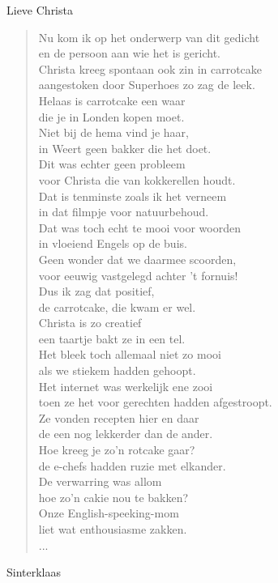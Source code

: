 \documentclass[12pt]{brief}
\begin{document}
\begin{letter}{Lieve Christa}
\begin{verse}
Nu kom ik op het onderwerp van dit gedicht\\
en de persoon aan wie het is gericht.\\
Christa kreeg spontaan ook zin in carrotcake\\
aangestoken door Superhoes zo zag de leek.\\[1.5em]

Helaas is carrotcake een waar\\
die je in Londen kopen moet.\\
Niet bij de hema vind je haar,\\
in Weert geen bakker die het doet.\\[1.5em]

Dit was echter geen probleem\\
voor Christa die van kokkerellen houdt.\\
Dat is tenminste zoals ik het verneem\\
in dat filmpje voor natuurbehoud.\\[1.5em]

Dat was toch echt te mooi voor woorden\\
in vloeiend Engels op de buis.\\
Geen wonder dat we daarmee scoorden,\\
voor eeuwig vastgelegd achter 't fornuis!\\[1.5em]

Dus ik zag dat positief,\\
de carrotcake, die kwam er wel.\\
Christa is zo creatief\\
een taartje bakt ze in een tel.\\[1.5em]

Het bleek toch allemaal niet zo mooi\\
als we stiekem hadden gehoopt.\\
Het internet was werkelijk ene zooi\\
toen ze het voor gerechten hadden afgestroopt.\\[1.5em]

Ze vonden recepten hier en daar\\
de een nog lekkerder dan de ander.\\
Hoe kreeg je zo'n rotcake gaar?\\
de e-chefs hadden ruzie met elkander.\\[1.5em]

De verwarring was allom\\
hoe zo'n cakie nou te bakken?\\
Onze English-speeking-mom\\
liet wat enthousiasme zakken.\\[1.5em]


...




\end{verse}


Sinterklaas


\closing{}

\end{letter}
\end{document}
